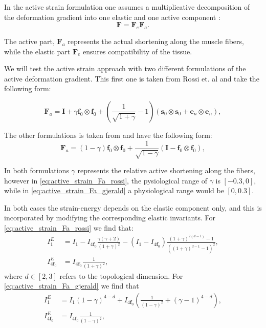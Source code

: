 \documentclass[a4paper,10pt]{article}
\newcommand{\ef}{\mathbf{f}_0}
\newcommand{\es}{\mathbf{s}_0}
\newcommand{\en}{\mathbf{e}_n}
\newcommand{\F}{\mathbf{F}}
\newcommand{\I}{\mathbf{I}}
\begin{document}
In the active strain formulation one assumes  a multiplicative 
decomposition of the deformation gradient into one elastic
and one active component \cite{ambrosi2011electromechanical}:
\begin{equation}
 \F = \F_e \F_a.
\label{eq:active_strain}
\end{equation}

The active part, $\F_a$ represents the actual shortening along the muscle fibers,
while the elastic part $\F_e$ ensures compatibility of the tissue. 

We will test the active strain approach with two different formulations of the
active deformation gradient. This first one is taken from Rossi et. al \cite{rossi2012orthotropic}
and take the following form:

\begin{equation}
 \F_a = \I +  \gamma \ef \otimes \ef  + \left( \frac{1}{\sqrt{1 + \gamma}} -1 \right) (\es \otimes \es + \en \otimes \en), 
 \label{eq:active_strain_Fa_rossi}
\end{equation}

The other formulations is taken from \cite{gjerald2014patient} and have the following form:
\begin{equation}
  \F_a = (1 - \gamma) \ef \otimes \ef  + \frac{1}{\sqrt{1 - \gamma}} (\I - \ef \otimes \ef), 
 \label{eq:active_strain_Fa_gjerald}
\end{equation}

In both formulations $\gamma$ represents the relative active shortening along the fibers, however in 
\eqref{eq:active_strain_Fa_rossi}, the pysiological range of $\gamma$ is $[-0.3,0]$, while in 
\eqref{eq:active_strain_Fa_gjerald} a physiological range would be $[0,0.3]$. 

In both cases the strain-energy depends on the elastic component only, and this is 
incorporated by modifying the corresponding elastic invariants. 
For \eqref{eq:active_strain_Fa_rossi} we find that:
\begin{align}
I_1^E &= I_1 - I_{4\ef} \frac{\gamma (\gamma +2)}{(1+\gamma)^2} - (I_1-I_{4\ef})\frac{(1 + \gamma)^{2(d-1)} - 1}{((1 + \gamma)^{d-1} - 1)^2},\\
I_{4\ef}^E &= I_{4\ef} \frac{1}{(1+\gamma)^2},
\end{align}
where $d \in [2,3]$ refers to the topological dimension. For \eqref{eq:active_strain_Fa_gjerald} we find that
\begin{align}
I_1^E &= I_1(1 - \gamma)^{4-d} +  I_{4\ef}\left(\frac{1}{(1-\gamma)^2} +(\gamma -1)^{4-d}\right) ,\\
I_{4\ef}^E &= I_{4\ef} \frac{1}{(1-\gamma)^2},
\end{align}
\end{document}
